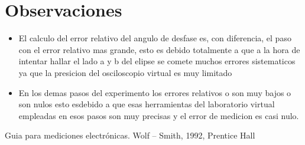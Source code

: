 \documentclass[twoside,twocolumn]{article}
\begin{document}
\section{Observaciones}

\begin{itemize}

\item El calculo del error relativo del angulo de desfase es, con diferencia, el paso con el error relativo mas grande, esto es debido totalmente a que a la hora de intentar hallar el lado a y b del elipse se comete muchos errores sistematicos ya que la presicion del osciloscopio virtual es muy limitado

\item En los demas pasos del experimento los errores relativos o son muy bajos o son nulos esto esdebido a que esas herramientas del laboratorio virtual empleadas en esos pasos son muy precisas y el error de medicion es casi nulo.

\end{itemize}

\newpage
\begin{thebibliography}{99} %

 Guia para mediciones electrónicas.
Wolf – Smith, 1992, Prentice Hall
 
\end{thebibliography}

\end{document}

